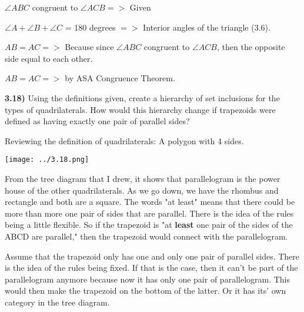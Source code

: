 \documentclass{article}
\begin{document}
$\angle ABC$ congruent to $\angle ACB =>$ Given 

\vspace{2mm}

$\angle A + \angle B + \angle C$ = 180 degrees $=>$ Interior angles of the triangle (3.6).

\vspace{2mm}

$AB=AC = >$ Because since $\angle{ABC}$ congruent to $\angle ACB$, then the opposite side equal to each other.

\vspace{2mm}

$AB = AC = >$ by ASA Congruence Theorem.



\newpage

\textbf{3.18)} Using the definitions given, create a hierarchy of set inclusions for the types of quadrilaterals. How would this hierarchy change if trapezoids were defined as having exactly one pair of parallel sides?

\vspace{3mm}

Reviewing the definition of quadrilaterals: A polygon with 4 sides. 

\vspace{3mm}


\texttt{[image: ../3.18.png]}

From the tree diagram that I drew, it shows that parallelogram is the power house of the other quadrilaterals. As we go down, we have the rhombus and rectangle and both are a square. The words "at least" means that there could be more than more one pair of sides that are parallel. There is the idea of the rules being a little flexible. So if the trapezoid is "at \textbf{least} one pair of the sides of the ABCD are parallel," then the trapezoid would connect with the parallelogram. 

\vspace{3mm}


Assume that the trapezoid only has one and only one pair of parallel sides. There is the idea of the rules being fixed. If that is the case, then it can't be part of the parallelogram anymore because now it has only one pair of parallelogram. This would then make the trapezoid on the bottom of the latter. Or it has its' own category in the tree diagram.
\vspace{3mm}
\end{document}
